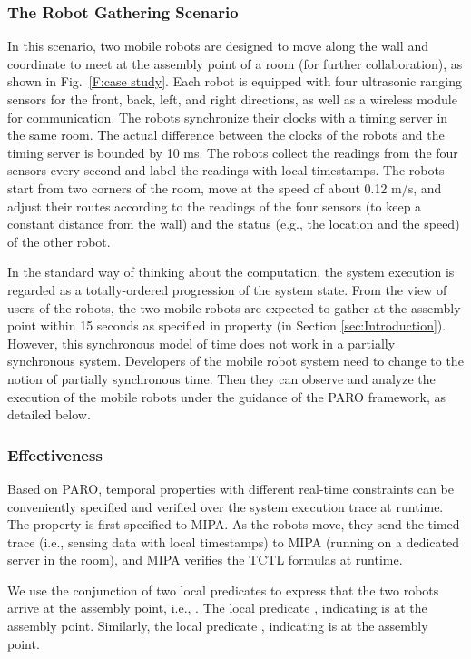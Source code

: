 \documentclass[10pt,conference,compsocconf,letterpaper]{IEEEtran}
\begin{document}
\subsubsection{The Robot Gathering Scenario}

In this scenario, two mobile robots are designed to move along the wall and coordinate to meet at the assembly point of a  room (for further collaboration), as shown in Fig.~\ref{F:case study}. Each robot is equipped with four ultrasonic ranging sensors for the front, back, left, and right directions, as well as a wireless module for communication. The robots synchronize their clocks with a timing server in the same room. The actual difference  between the clocks of the robots and the timing server is bounded by 10 ms. The robots collect the readings from the four sensors every second and label the readings with local timestamps. The robots start from two corners of the room, move at the speed of about 0.12 m/s, and adjust their routes according to the readings of the four sensors (to keep a constant distance from the wall) and the status (e.g., the location and the speed) of the other robot.

In the standard way of thinking about the computation, the system execution is regarded as a totally-ordered progression of the system state. From the view of users of the robots, the two mobile robots are expected to gather at the assembly point within 15 seconds as specified in property  (in Section \ref{sec:Introduction}). However, this synchronous model of time does not work in a partially synchronous system. Developers of the mobile robot system need to change to the notion of partially synchronous time. Then they can observe and analyze the execution of the mobile robots under the guidance of the \textsf{PARO} framework, as detailed below.

\subsubsection{Effectiveness}

Based on \textsf{PARO}, temporal properties with different real-time constraints can be conveniently specified and verified over the system execution trace at runtime. The property is first specified to MIPA. As the robots move, they send the timed trace (i.e., sensing data with local timestamps) to MIPA (running on a dedicated server in the room), and MIPA verifies the TCTL formulas at runtime.

We use the conjunction of two local predicates to express that the two robots arrive at the assembly point, i.e., . The local predicate , indicating  is at the assembly point. Similarly, the local predicate , indicating  is at the assembly point.
\end{document}
